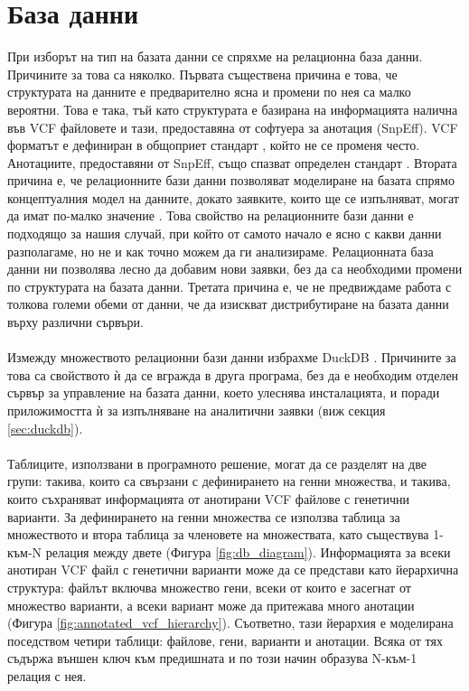 \documentclass[pdftex,cyrillic,14pt,a4page,twoside,openright]{extreport}
\begin{document}
\section{База данни}
При изборът на тип на базата данни се спряхме на релационна база данни. Причините за това са няколко. Първата съществена причина е това, че структурата на данните е предварително ясна и промени по нея са малко вероятни. Това е така, тъй като структурата е базирана на информацията налична във VCF файловете и тази, предоставяна от софтуера за анотация (SnpEff). VCF форматът е дефиниран в общоприет стандарт \cite{danecek2011variant}, който не се променя често. Анотациите, предоставяни от SnpEff, също спазват определен стандарт \cite{cingolani2018variant}. Втората причина е, че релационните бази данни позволяват моделиране на базата спрямо концептуалния модел на данните, докато заявките, които ще се изпълняват, могат да имат по-малко значение \cite{chebotko2015}. Това свойство на релационните бази данни е подходящо за нашия случай, при който от самото начало е ясно с какви данни разполагаме, но не и как точно можем да ги анализираме. Релационната база данни ни позволява лесно да добавим нови заявки, без да са необходими промени по структурата на базата данни. Третата причина е, че не предвиждаме работа с толкова големи обеми от данни, че да изискват дистрибутиране на базата данни върху различни сървъри.

\paragraph{}
Измежду множеството релационни бази данни избрахме DuckDB \cite{raasveldt2019}. Причините за това са свойството ѝ да се вгражда в друга програма, без да е необходим отделен сървър за управление на базата данни, което улеснява инсталацията, и поради приложимостта ѝ за изпълняване на аналитични заявки (виж секция \ref{sec:duckdb}).

\paragraph{}
Таблиците, използвани в програмното решение, могат да се разделят на две групи: такива, които са свързани с дефинирането на генни множества, и такива, които съхраняват информацията от анотирани VCF файлове с генетични варианти. За дефинирането на генни множества се използва таблица за множеството и втора таблица за членовете на множествата, като съществува 1-към-N релация между двете (Фигура \ref{fig:db_diagram}). Информацията за всеки анотиран VCF файл с генетични варианти може да се представи като йерархична структура: файлът включва множество гени, всеки от които е засегнат от множество варианти, а всеки вариант може да притежава много анотации (Фигура \ref{fig:annotated_vcf_hierarchy}). Съответно, тази йерархия е моделирана поседством четири таблици: файлове, гени, варианти и анотации. Всяка от тях съдържа външен ключ към предишната и по този начин образува N-към-1 релация с нея.
\end{document}
